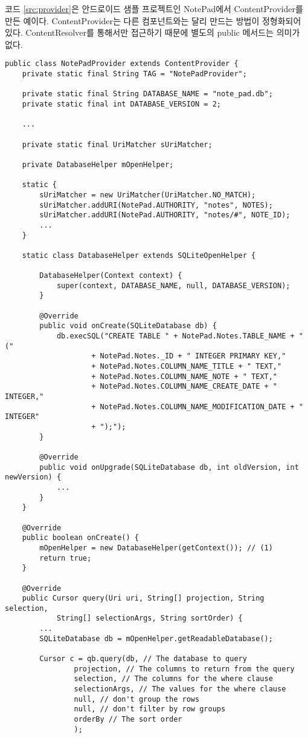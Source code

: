 
코드 \ref{src:provider}은 안드로이드 샘플 프로젝트인 NotePad에서 ContentProvider를 만든 예이다. 
ContentProvider는 다른 컴포넌트와는 달리 만드는 방법이 정형화되어 있다. 
ContentResolver를 통해서만 접근하기 때문에 별도의 public 메서드는 의미가 없다.

\begin{lstlisting}[frame=single, caption=ContentProvider 예, label=src:provider] 
public class NotePadProvider extends ContentProvider {
	private static final String TAG = "NotePadProvider";

	private static final String DATABASE_NAME = "note_pad.db";
	private static final int DATABASE_VERSION = 2;

	...

	private static final UriMatcher sUriMatcher;

	private DatabaseHelper mOpenHelper;

	static {
		sUriMatcher = new UriMatcher(UriMatcher.NO_MATCH);
		sUriMatcher.addURI(NotePad.AUTHORITY, "notes", NOTES);
		sUriMatcher.addURI(NotePad.AUTHORITY, "notes/#", NOTE_ID);
		...
	}

	static class DatabaseHelper extends SQLiteOpenHelper {

		DatabaseHelper(Context context) {
			super(context, DATABASE_NAME, null, DATABASE_VERSION);
		}

		@Override
		public void onCreate(SQLiteDatabase db) {
			db.execSQL("CREATE TABLE " + NotePad.Notes.TABLE_NAME + " ("
					+ NotePad.Notes._ID + " INTEGER PRIMARY KEY,"
					+ NotePad.Notes.COLUMN_NAME_TITLE + " TEXT,"
					+ NotePad.Notes.COLUMN_NAME_NOTE + " TEXT,"
					+ NotePad.Notes.COLUMN_NAME_CREATE_DATE + " INTEGER,"
					+ NotePad.Notes.COLUMN_NAME_MODIFICATION_DATE + " INTEGER"
					+ ");");
		}

		@Override
		public void onUpgrade(SQLiteDatabase db, int oldVersion, int newVersion) {
			...
		}
	}

	@Override
	public boolean onCreate() {
		mOpenHelper = new DatabaseHelper(getContext()); // (1)
		return true;
	}

	@Override
	public Cursor query(Uri uri, String[] projection, String selection,
			String[] selectionArgs, String sortOrder) {
		...
		SQLiteDatabase db = mOpenHelper.getReadableDatabase();

		Cursor c = qb.query(db, // The database to query
				projection, // The columns to return from the query
				selection, // The columns for the where clause
				selectionArgs, // The values for the where clause
				null, // don't group the rows
				null, // don't filter by row groups
				orderBy // The sort order
				);


\end{lstlisting}
